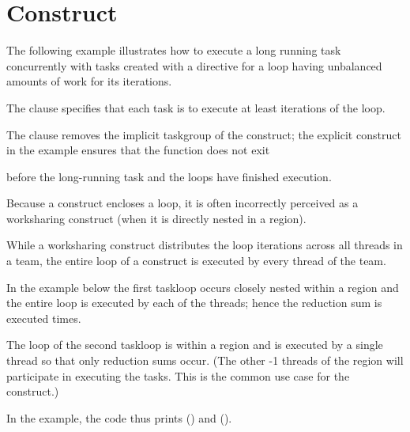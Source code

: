 \section{ Construct}
\label{sec:taskloop}

The following example illustrates how to execute a long running task concurrently with tasks created
with a  directive for a loop having unbalanced amounts of work for its iterations.

The  clause specifies that each task is to execute at least  iterations of the loop.

The  clause removes the implicit taskgroup of the  construct;
the explicit  construct in the example ensures that the function does not exit

before the long-running task and the loops have finished execution.




Because a  construct encloses a loop, it is often incorrectly
perceived as a worksharing construct (when it is directly nested in
a  region).

While a worksharing construct distributes the loop iterations across all threads in a team,
the entire loop of a  construct is executed by every thread of the team.

In the example below the first taskloop occurs closely nested within
a  region and the entire loop is executed by each of the  threads;
hence the reduction sum is executed  times.

The loop of the second taskloop is within a  region and is executed
by a single thread so that only  reduction sums occur.  (The other
-1 threads of the  region will participate in executing the
tasks. This is the common use case for the  construct.)

In the example, the code thus prints  () and
 ().


